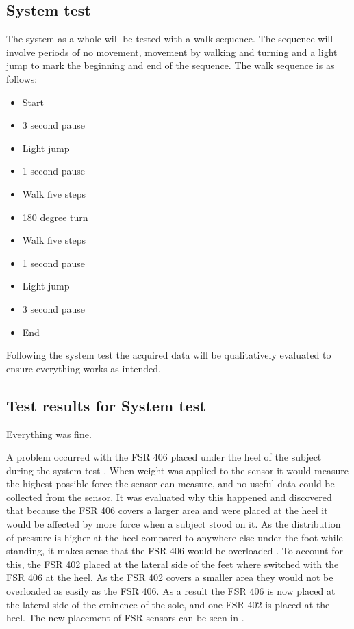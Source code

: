 \subsection{System test}
The system as a whole will be tested with a walk sequence. The sequence will involve periods of no movement, movement by walking and turning and a light jump to mark the beginning and end of the sequence. The walk sequence is as follows:
\begin{itemize}
	\item Start
	\item 3 second pause
	\item Light jump
	\item 1 second pause
	\item Walk five steps
	\item 180 degree turn
	\item Walk five steps
	\item 1 second pause
	\item Light jump
	\item 3 second pause
	\item End
\end{itemize}
Following the system test the acquired data will be qualitatively evaluated to ensure everything works as intended. 

\subsection{Test results for System test}
Everything was fine. 

A problem occurred with the FSR 406 placed under the heel of the subject during the system test . When weight was applied to the sensor it would measure the highest possible force the sensor can measure, and no useful data could be collected from the sensor. It was evaluated why this happened and discovered that because the FSR 406 covers a larger area and were placed at the heel it would be affected by more force when a subject stood on it. As the distribution of pressure is higher at the heel compared to anywhere else under the foot while standing, it makes sense that the FSR 406 would be overloaded \cite{Hessert2005}. To account for this, the FSR 402 placed at the lateral side of the feet where switched with the FSR 406 at the heel. As the FSR 402 covers a smaller area they would not be overloaded as easily as the FSR 406. As a result the FSR 406 is now placed at the lateral side of the eminence of the sole, and one FSR 402 is placed at the heel. The new placement of FSR sensors can be seen in .

